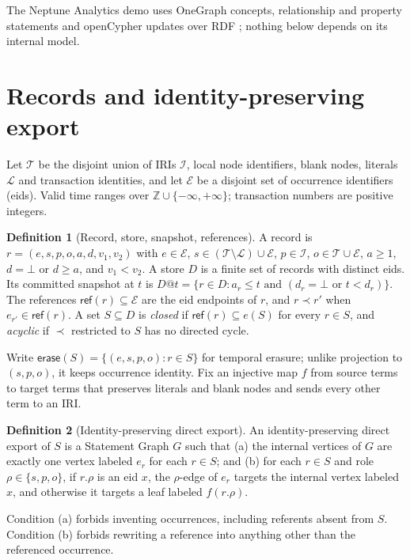 \documentclass[11pt]{article}
\theoremstyle{plain}
\theoremstyle{definition}
\newtheorem{definition}{Definition}
\theoremstyle{remark}
\newcommand{\Stmt}{\mathcal E}
\newcommand{\Term}{\mathcal T}
\newcommand{\Iri}{\mathcal I}
\newcommand{\refs}{\prec}
\newcommand{\Erase}{\mathsf{erase}}
\newcommand{\refset}{\mathsf{ref}}
\begin{document}
The Neptune Analytics demo uses OneGraph concepts, relationship and property
statements and openCypher updates over RDF \cite{schmidt2024opencypher}; nothing
below depends on its internal model.

\section{Records and identity-preserving export}\label{sec:model}
Let $\Term$ be the disjoint union of IRIs $\Iri$, local node identifiers, blank
nodes, literals $\mathcal L$ and transaction identities, and let $\Stmt$ be a
disjoint set of occurrence identifiers (eids). Valid time ranges over
$\mathbb Z\cup\{-\infty,+\infty\}$; transaction numbers are positive integers.

\begin{definition}[Record, store, snapshot, references]
A record is $r=(e,s,p,o,a,d,v_1,v_2)$ with $e\in\Stmt$,
$s\in(\Term\setminus\mathcal L)\cup\Stmt$, $p\in\Iri$, $o\in\Term\cup\Stmt$,
$a\ge1$, $d=\bot$ or $d\ge a$, and $v_1<v_2$. A store $D$ is a finite set of
records with distinct eids. Its committed snapshot at $t$ is
$D@t=\{r\in D:a_r\le t\text{ and }(d_r=\bot\text{ or }t<d_r)\}$.
The references $\refset(r)\subseteq\Stmt$ are the eid endpoints of $r$, and
$r\refs r'$ when $e_{r'}\in\refset(r)$. A set $S\subseteq D$ is \emph{closed} if
$\refset(r)\subseteq e(S)$ for every $r\in S$, and \emph{acyclic} if $\refs$
restricted to $S$ has no directed cycle.
\end{definition}

Write $\Erase(S)=\{(e,s,p,o):r\in S\}$ for temporal erasure; unlike projection to
$(s,p,o)$, it keeps occurrence identity. Fix an injective map $f$ from source
terms to target terms that preserves literals and blank nodes and sends every other
term to an IRI.

\begin{definition}[Identity-preserving direct export]\label{def:direct}
An identity-preserving direct export of $S$ is a Statement Graph $G$ such that
(a) the internal vertices of $G$ are exactly one vertex labeled $e_r$ for each
$r\in S$; and (b) for each $r\in S$ and role $\rho\in\{s,p,o\}$, if $r.\rho$ is an
eid $x$, the $\rho$-edge of $e_r$ targets the internal vertex labeled $x$, and
otherwise it targets a leaf labeled $f(r.\rho)$.
\end{definition}

Condition (a) forbids inventing occurrences, including referents absent from $S$.
Condition (b) forbids rewriting a reference into anything other than the
referenced occurrence.
\end{document}
